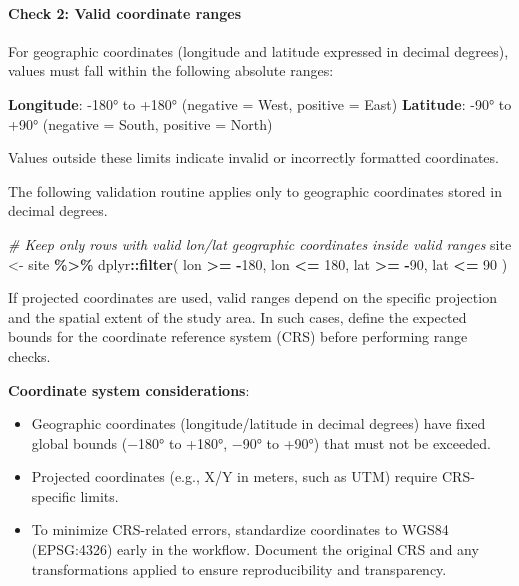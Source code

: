 \documentclass[
  10pt,
  b5paper,
  oneside]{book}
\newenvironment{Shaded}{\begin{snugshade}}{\end{snugshade}}
\newcommand{\CommentTok}[1]{\textcolor[rgb]{0.56,0.35,0.01}{\textit{#1}}}
\newcommand{\DecValTok}[1]{\textcolor[rgb]{0.00,0.00,0.81}{#1}}
\newcommand{\FunctionTok}[1]{\textcolor[rgb]{0.13,0.29,0.53}{\textbf{#1}}}
\newcommand{\NormalTok}[1]{#1}
\newcommand{\OtherTok}[1]{\textcolor[rgb]{0.56,0.35,0.01}{#1}}
\newcommand{\SpecialCharTok}[1]{\textcolor[rgb]{0.81,0.36,0.00}{\textbf{#1}}}
\begin{document}
\paragraph*{Check 2: Valid coordinate ranges}\label{check-2-valid-coordinate-ranges}

For geographic coordinates (longitude and latitude expressed in decimal degrees), values must fall within the following absolute ranges:

\textbf{Longitude}: -180° to +180° (negative = West, positive = East)
\textbf{Latitude}: -90° to +90° (negative = South, positive = North)

Values outside these limits indicate invalid or incorrectly formatted coordinates.

The following validation routine applies only to geographic coordinates stored in decimal degrees.

\begin{Shaded}
\begin{Highlighting}[]
\CommentTok{\# Keep only rows with valid lon/lat geographic coordinates inside valid ranges}
\NormalTok{site }\OtherTok{\textless{}{-}}\NormalTok{ site }\SpecialCharTok{\%\textgreater{}\%}
\NormalTok{  dplyr}\SpecialCharTok{::}\FunctionTok{filter}\NormalTok{(}
\NormalTok{    lon }\SpecialCharTok{\textgreater{}=} \SpecialCharTok{{-}}\DecValTok{180}\NormalTok{, lon }\SpecialCharTok{\textless{}=} \DecValTok{180}\NormalTok{,}
\NormalTok{    lat }\SpecialCharTok{\textgreater{}=}  \SpecialCharTok{{-}}\DecValTok{90}\NormalTok{, lat }\SpecialCharTok{\textless{}=}  \DecValTok{90}
\NormalTok{  )}
\end{Highlighting}
\end{Shaded}

If projected coordinates are used, valid ranges depend on the specific projection and the spatial extent of the study area. In such cases, define the expected bounds for the coordinate reference system (CRS) before performing range checks.

\textbf{Coordinate system considerations}:

\begin{itemize}
\item
  Geographic coordinates (longitude/latitude in decimal degrees) have fixed global bounds (−180° to +180°, −90° to +90°) that must not be exceeded.
\item
  Projected coordinates (e.g., X/Y in meters, such as UTM) require CRS-specific limits.
\item
  To minimize CRS-related errors, standardize coordinates to WGS84 (EPSG:4326) early in the workflow. Document the original CRS and any transformations applied to ensure reproducibility and transparency.
\end{itemize}
\end{document}
